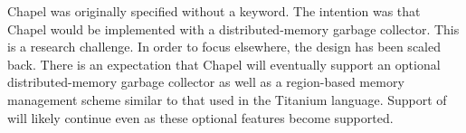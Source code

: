 \begin{openissue}
Chapel was originally specified without a  keyword.  The intention
was that Chapel would be implemented with a distributed-memory garbage
collector.  This is a research challenge.  In order to focus elsewhere, the
design has been scaled back.  There is an expectation that Chapel will
eventually support an optional distributed-memory garbage collector as well as
a region-based memory management scheme similar to that used in the Titanium
language.  Support of  will likely continue even as these optional
features become supported.
\end{openissue}
